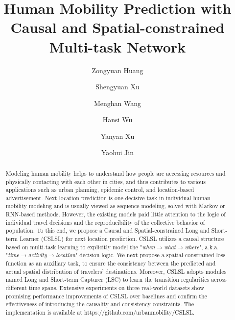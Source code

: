 \documentclass[sigconf]{acmart}
\begin{document}
\title{Human Mobility Prediction with Causal and Spatial-constrained Multi-task Network}

\author{Zongyuan Huang}

\author{Shengyuan Xu}


\author{Menghan Wang}

\author{Hansi Wu}

\author{Yanyan Xu}

\author{Yaohui Jin}
\authornotemark[1]

\renewcommand{\shortauthors}{Zongyuan Huang et al.}

\begin{abstract}
   Modeling human mobility helps to understand how people are accessing resources and physically contacting with each other in cities, and thus contributes to various applications such as urban planning, epidemic control, and location-based advertisement. Next location prediction is one decisive task in individual human mobility modeling and is usually viewed as sequence modeling, solved with Markov or RNN-based methods. However, the existing models paid little attention to the logic of individual travel decisions and the reproducibility of the collective behavior of population. To this end, we propose a Causal and Spatial-constrained Long and Short-term Learner (CSLSL) for next location prediction. CSLSL utilizes a causal structure based on multi-task learning to explicitly model the "\textit{when$\rightarrow$what$\rightarrow$where}", a.k.a. "\textit{time$\rightarrow$activity$\rightarrow$location}" decision logic. We next propose a spatial-constrained loss function as an auxiliary task, to ensure the consistency between the predicted and actual spatial distribution of travelers' destinations. Moreover, CSLSL adopts modules named Long and Short-term Capturer (LSC) to learn the transition regularities across different time spans. Extensive experiments on three real-world datasets show promising performance improvements of CSLSL over baselines and confirm the effectiveness of introducing the causality and consistency constraints. 
   The implementation is available at https://github.com/urbanmobility/CSLSL.
\end{abstract}
\end{document}
